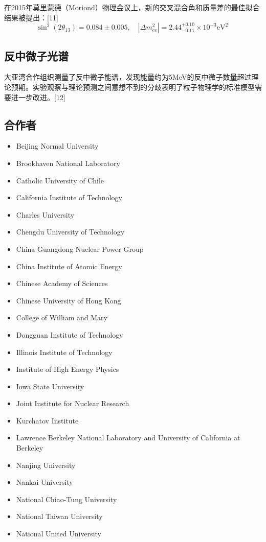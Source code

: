 在2015年莫里蒙德（Moriond）物理会议上，新的交叉混合角和质量差的最佳拟合结果被提出：[11]
$$\sin^2(2 \theta_{13}) = 0.084 \pm 0.005, \quad \left| \Delta m^2_{ee} \right| = 2.44^{+0.10}_{-0.11} \times 10^{-3} \text{eV}^2~$$

\subsection{反中微子光谱}
大亚湾合作组织测量了反中微子能谱，发现能量约为5MeV的反中微子数量超过理论预期。实验观察与理论预测之间意想不到的分歧表明了粒子物理学的标准模型需要进一步改进。[12]

\subsection{合作者}
\begin{itemize}
\item Beijing Normal University
\item Brookhaven National Laboratory
\item Catholic University of Chile
\item California Institute of Technology
\item Charles University
\item Chengdu University of Technology
\item China Guangdong Nuclear Power Group
\item China Institute of Atomic Energy
\item Chinese Academy of Sciences
\item Chinese University of Hong Kong
\item College of William and Mary
\item Dongguan Institute of Technology
\item Illinois Institute of Technology
\item Institute of High Energy Physics
\item Iowa State University
\item Joint Institute for Nuclear Research
\item Kurchatov Institute
\item Lawrence Berkeley National Laboratory and University of California at Berkeley
\item Nanjing University
\item Nankai University
\item National Chiao-Tung University
\item National Taiwan University
\item National United University

\end{itemize}
